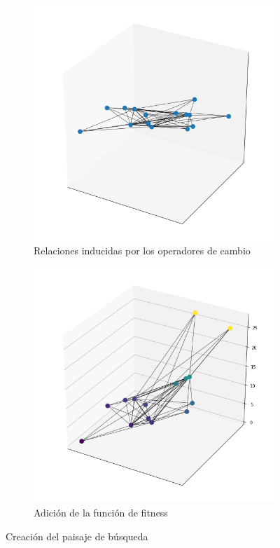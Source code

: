 \begin{figure}
\begin{subfigure}{.5\textwidth}
    \includegraphics[scale=.5]{Imagenes/search2.png}
    \caption{Relaciones inducidas por los operadores de cambio}
\end{subfigure}
\begin{subfigure}{\textwidth}
    \centering
    \includegraphics[scale=.5]{Imagenes/search3.png}
    \caption{Adición de la función de fitness}    
\end{subfigure}
\caption{Creación del paisaje de búsqueda}
\label{fig:landscape}
\end{figure}

